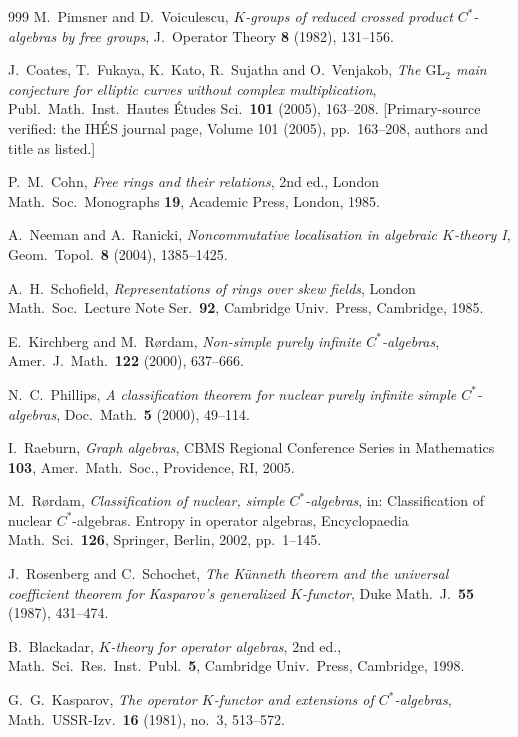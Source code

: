 \begin{thebibliography}{999}
 M.~Pimsner and D.~Voiculescu, \emph{$K$-groups of reduced crossed product $C^*$-algebras by free groups}, J.\ Operator Theory \textbf{8} (1982), 131--156.

 J.~Coates, T.~Fukaya, K.~Kato, R.~Sujatha and O.~Venjakob, \emph{The $\mathrm{GL}_2$ main conjecture for elliptic curves without complex multiplication}, Publ.\ Math.\ Inst.\ Hautes \'Etudes Sci.\ \textbf{101} (2005), 163--208. [Primary-source verified: the IH\'ES journal page, Volume 101 (2005), pp.~163--208, authors and title as listed.]

 P.~M.~Cohn, \emph{Free rings and their relations}, 2nd ed., London Math.\ Soc.\ Monographs \textbf{19}, Academic Press, London, 1985.

 A.~Neeman and A.~Ranicki, \emph{Noncommutative localisation in algebraic $K$-theory I}, Geom.\ Topol.\ \textbf{8} (2004), 1385--1425.

 A.~H.~Schofield, \emph{Representations of rings over skew fields}, London Math.\ Soc.\ Lecture Note Ser.\ \textbf{92}, Cambridge Univ.\ Press, Cambridge, 1985.

 E.~Kirchberg and M.~R\o rdam, \emph{Non-simple purely infinite $C^*$-algebras}, Amer.\ J.\ Math.\ \textbf{122} (2000), 637--666.

 N.~C.~Phillips, \emph{A classification theorem for nuclear purely infinite simple $C^*$-algebras}, Doc.\ Math.\ \textbf{5} (2000), 49--114.

 I.~Raeburn, \emph{Graph algebras}, CBMS Regional Conference Series in Mathematics \textbf{103}, Amer.\ Math.\ Soc., Providence, RI, 2005.

 M.~R\o rdam, \emph{Classification of nuclear, simple $C^*$-algebras}, in: Classification of nuclear $C^*$-algebras. Entropy in operator algebras, Encyclopaedia Math.\ Sci.\ \textbf{126}, Springer, Berlin, 2002, pp.~1--145.

 J.~Rosenberg and C.~Schochet, \emph{The K\"unneth theorem and the universal coefficient theorem for Kasparov's generalized $K$-functor}, Duke Math.\ J.\ \textbf{55} (1987), 431--474.

 B.~Blackadar, \emph{$K$-theory for operator algebras}, 2nd ed., Math.\ Sci.\ Res.\ Inst.\ Publ.\ \textbf{5}, Cambridge Univ.\ Press, Cambridge, 1998.

 G.~G.~Kasparov, \emph{The operator $K$-functor and extensions of $C^*$-algebras}, Math.\ USSR-Izv.\ \textbf{16} (1981), no.~3, 513--572.


\end{thebibliography}
